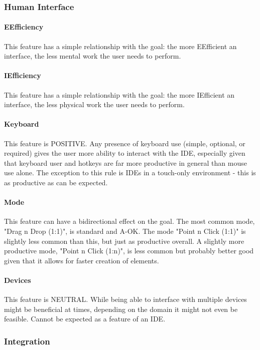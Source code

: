\subsubsection{Human Interface}

\paragraph{EEfficiency} This feature has a simple relationship with the
goal: the more EEfficient an interface, the less mental work the user needs
to perform.

\paragraph{IEfficiency} This feature has a simple relationship with the
goal: the more IEfficient an interface, the less physical work the user
needs to perform.

\paragraph{Keyboard} This feature is POSITIVE. Any presence of keyboard use
(simple, optional, or required) gives the user more ability to interact
with the IDE, especially given that keyboard user and hotkeys are far more
productive in general than mouse use alone. The exception to this rule is
IDEs in a touch-only environment - this is as productive as can be
expected.

\paragraph{Mode} This feature can have a bidirectional effect on the goal.
The most common mode, "Drag n Drop (1:1)", is standard and A-OK. The mode
"Point n Click (1:1)" is slightly less common than this, but just as
productive overall. A slightly more productive mode, "Point n Click (1:n)",
is less common but probably better good given that it allows for faster
creation of elements.

\paragraph{Devices} This feature is NEUTRAL. While being able to interface
with multiple devices might be beneficial at times, depending on the domain
it might not even be feasible. Cannot be expected as a feature of an IDE.


\subsubsection{Integration}

